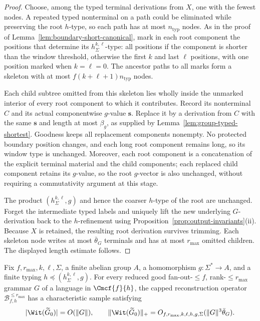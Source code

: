 \begin{proof}
Choose, among the typed terminal derivations
from $X$, one with the fewest nodes.
A repeated typed nonterminal on a path
could be eliminated while preserving the
root $h$-type, so each path has at most
$n_{\mathrm{typ}}$ nodes.
As in the proof of
Lemma~\ref{lem:boundary-short-canonical},
mark in each root component the positions
that determine its $h_\Sigma^{k,\ell}$-type:
all positions if the component is shorter
than the window threshold, otherwise the
first $k$ and last $\ell$ positions, with
one position marked when $k=\ell=0$.
The ancestor paths to all marks form a
skeleton with at most
$f(k+\ell+1)n_{\mathrm{typ}}$ nodes.

Each child subtree omitted from this
skeleton lies wholly inside the unmarked
interior of every root component to which
it contributes. Record its nonterminal
$C$ and its actual componentwise $g$-value
$\mathbf s$. Replace it by a derivation
from $C$ with the same $\mathbf s$
and length at most $\beta_g$, as supplied
by Lemma~\ref{lem:group-typed-shortest}.
Goodness keeps all replacement components
nonempty. No protected boundary position
changes, and each long root component
remains long, so its window type is
unchanged. Moreover, each root component
is a concatenation of the explicit
terminal material and the child components;
each replaced child component retains its
$g$-value, so the root $g$-vector is also
unchanged, without requiring a
commutativity argument at this stage.

The product $(h_\Sigma^{k,\ell},g)$ and hence
the coarser $h$-type of the root are
unchanged. Forget the intermediate typed
labels and uniquely lift the new
underlying $G$-derivation back to the
$h$-refinement using
Proposition~\ref{prop:output-invariants}(ii).
Because $X$ is retained, the resulting
root derivation survives trimming.
Each skeleton node writes at most
$\bar\theta_G$ terminals and has at most
$r_{\max}$ omitted children. The
displayed length estimate follows.
\end{proof}

\begin{theorem}
\label{thm:window-abelian-polydata}
Fix $f,r_{\max},k,\ell,\Sigma$, a
finite abelian group $A$, a homomorphism
$g:\Sigma^*\to A$, and a finite typing
$h\preceq(h_\Sigma^{k,\ell},g)$.
For every reduced good fan-out-$\le f$,
rank-$\le r_{\max}$ grammar $G$ of a
language in $\Cmcf{f}{h}$, the capped
reconstruction operator $\mathcal B^{\le r_{\max}}_{f,h}$
has a characteristic sample
satisfying
\[
 |\Wit(\widetilde G_0)|=O(\|G\|),\qquad
 \|\Wit(\widetilde G_0)\|_+
   =O_{f,r_{\max},k,\ell,h,g,\Sigma}
     (\|G\|^3\bar\theta_G).
\]
\end{theorem}

